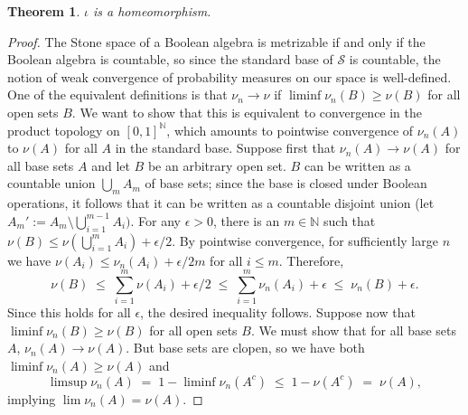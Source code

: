 \documentclass[12pt]{article}
\newcommand{\NN}{\mathbb{N}}
\newcommand{\cS}{\mathcal{S}}
\theoremstyle{plain}
\newtheorem{theorem}{Theorem}[subsection]
\theoremstyle{definition}
\theoremstyle{remark}
\begin{document}
\begin{theorem}
$\iota$ is a homeomorphism.
\end{theorem}
\begin{proof}
The Stone space of a Boolean algebra is metrizable if and only if the Boolean algebra is countable, so since the standard base of $\cS$ is countable, the notion of weak convergence of probability measures on our space is well-defined. One of the equivalent definitions is that $\nu_n\to\nu$ if $\liminf\nu_n(B)\ge\nu(B)$ for all open sets $B$. We want to show that this is equivalent to convergence in the product topology on $[0,1]^\NN$, which amounts to pointwise convergence of $\nu_n(A)$ to $\nu(A)$ for all $A$ in the standard base.
Suppose first that $\nu_n(A)\to\nu(A)$ for all base sets $A$ and let $B$ be an arbitrary open set. $B$ can be written as a countable union $\textstyle\bigcup_m A_m$ of base sets; since the base is closed under Boolean operations, it follows that it can be written as a countable disjoint union (let $\textstyle A_m' := A_m\setminus\bigcup_{i=1}^{m-1}A_i)$. For any $\epsilon>0$, there is an $m\in\mathbb{N}$ such that $\textstyle\nu(B)\le\nu(\bigcup_{i=1}^m A_i)+\epsilon/2$. By pointwise convergence, for sufficiently large $n$ we have $\nu(A_i)\le\nu_n(A_i) + \epsilon/2m$ for all $i\le m$. Therefore,
\[
\textstyle\nu(B)\;\le\;\sum_{i=1}^m\nu(A_i)+\epsilon/2\;\le\;\sum_{i=1}^m\nu_n(A_i) + \epsilon\;\le\;\nu_n(B)+\epsilon.
\]
Since this holds for all $\epsilon$, the desired inequality follows.
Suppose now that $\liminf\nu_n(B)\ge\nu(B)$ for all open sets $B$. We must show that for all base sets $A$, $\nu_n(A)\to\nu(A)$. But base sets are clopen, so we have both $\liminf\nu_n(A)\ge\nu(A)$ and
\[
\limsup\nu_n(A) \;=\; 1-\liminf\nu_n(A^c) \;\le\; 1 - \nu(A^c) \;=\; \nu(A),
\]
implying $\lim\nu_n(A) = \nu(A)$.
\end{proof}
\end{document}
